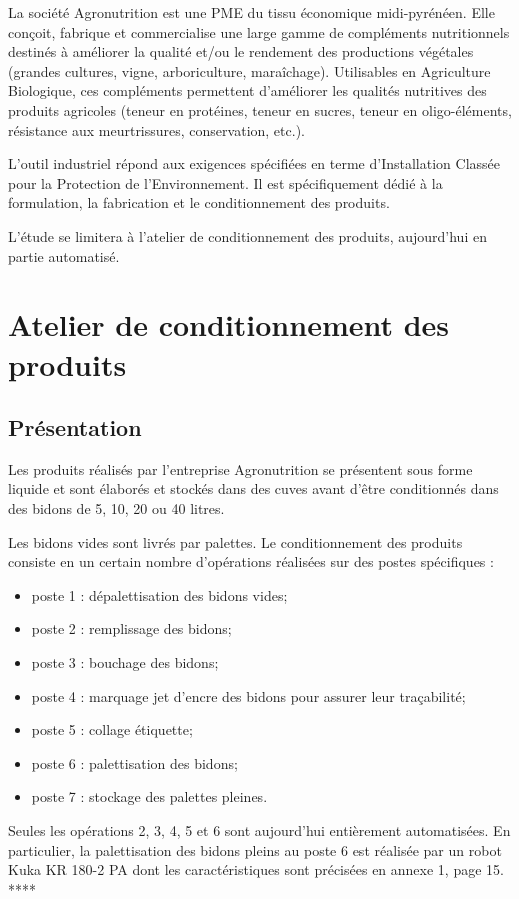 La société Agronutrition est une PME du tissu économique midi-pyrénéen. Elle conçoit, 
fabrique et commercialise une large gamme de compléments nutritionnels destinés à 
améliorer la qualité et/ou le rendement des productions végétales (grandes cultures, vigne, 
arboriculture, maraîchage). Utilisables en Agriculture Biologique, ces compléments 
permettent d'améliorer les qualités nutritives des produits agricoles (teneur en protéines, 
teneur en sucres, teneur en oligo-éléments, résistance aux meurtrissures, conservation, etc.). 

L’outil industriel répond aux exigences spécifiées en terme d’Installation Classée pour la 
Protection de l’Environnement. Il est spécifiquement dédié à la formulation, la fabrication et 
le conditionnement des produits. 

L’étude se limitera à l’atelier de conditionnement des produits, aujourd’hui en partie 
automatisé.

\section{Atelier de conditionnement des produits}

\subsection{Présentation }
Les produits réalisés par l’entreprise Agronutrition se présentent sous forme liquide et sont 
élaborés et stockés dans des cuves avant d’être conditionnés dans des bidons de 5, 10, 20 ou 
40 litres. 

Les bidons vides sont livrés par palettes. Le conditionnement des produits consiste en un 
certain nombre d’opérations réalisées sur des postes spécifiques : 
\begin{itemize}
\item poste 1 : dépalettisation des bidons vides;
\item poste 2 : remplissage des bidons;
\item poste 3 : bouchage des bidons;
\item poste 4 : marquage jet d’encre des bidons pour assurer leur traçabilité;
\item poste 5 : collage étiquette;
\item poste 6 : palettisation des bidons;
\item poste 7 : stockage des palettes pleines. 
\end{itemize}
Seules les opérations 2, 3, 4, 5 et 6 sont aujourd’hui entièrement automatisées. En particulier, 
la palettisation des bidons pleins au poste 6 est réalisée par un robot Kuka KR 180-2 PA dont 
les caractéristiques sont précisées en annexe 1, page 15. ****

